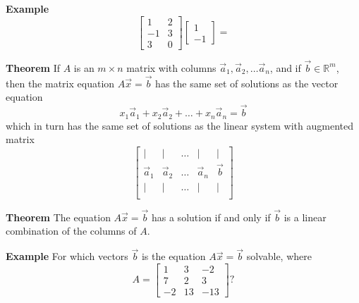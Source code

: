   \begin{frame}[fragile]
\textbf{Example}
\[
 \left[\begin{array}{rr}
  1 & 2 \\
  -1 & 3 \\
  3 & 0 
 \end{array}\right]
\left[\begin{array}{r}
 1 \\ -1
\end{array}\right]
=
\]

\end{frame}

  \begin{frame}[fragile]
\textbf{Theorem}
 If $A$ is an $m \times n$ matrix with columns 
 $\vec{a}_1, \vec{a}_2, \dots \vec{a}_n$, 
 and if $\vec{b}\in \mathbb R^m$, then the matrix equation 
 $A \vec{x} =\vec{b}$ has the same set of solutions 
 as the vector equation
 \[
  x_1\vec{a}_1 + x_2 \vec{a}_2 + \dots + x_n \vec{a}_n = \vec{b}
 \]
which in turn has the same set of solutions as the linear
system with augmented matrix 
\[
 \left[\begin{array}{ccccc}
  | & | & \dots & | & |  \\
  \vec{a}_1 & \vec{a}_2 & \dots & \vec{a}_n & \vec{b} \\
  | & | & \dots & | &| \\
 \end{array}\right]
\]


%
\end{frame}

  \begin{frame}[fragile]
\textbf{Theorem} The equation $A \vec{x} = \vec{b}$ has a solution
 if and only if $\vec{b}$ is a linear combination of the columns of $A$.


%
%
\end{frame}

  \begin{frame}[fragile]
\textbf{Example}
For which vectors $\vec{b}$ is the equation $A\vec{x}=\vec{b}$
solvable, where 
\[
 A = \left[\begin{array}{rrr}
      1 & 3 & -2 \\
      7 & 2 & 3  \\
      -2 & 13 &-13
     \end{array}\right]?
\]

\end{frame}

